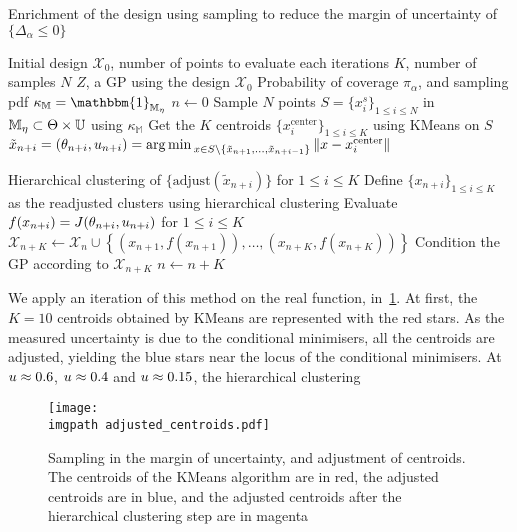 \documentclass[../../Main_ManuscritThese.tex]{subfiles}
\newcommand\imgpath{/home/victor/acadwriting/Manuscrit/Text/Chapter4/img/}
\begin{document}
\begin{algorithm}
  \caption{Enrichment of the design using sampling to reduce the margin of uncertainty of $\{\Delta_{\alpha}\leq 0\}$}
  \label{alg:sampling_enrichment_star}
\begin{algorithmic}
  \REQUIRE Initial design $\mathcal{X}_0$, 
  \REQUIRE number of points to evaluate each iterations $K$, number of samples $N$
  \REQUIRE $Z$, a GP using the design $\mathcal{X}_0$
  \REQUIRE Probability of coverage $\pi_{\alpha}$, and sampling pdf $\kappa_{\mathbb{M}} = \mathbbm{1}_{\mathbb{M}_{\eta}}$
\STATE $n \leftarrow 0$
\STATE Sample $N$ points $S = \{x^s_i\}_{1 \leq i \leq N}$ in $\mathbb{M}_{\eta}\subset \Theta \times \mathbb{U}$ using $\kappa_{\mathbb{M}}$
\STATE Get the $K$ centroids $\{x_i^{\mathrm{center}}\}_{1 \leq i \leq K}$ using KMeans on $S$
\STATE $\tilde{x}_{n+i}=(\theta_{n+i},u_{n+i})=\operatorname*{arg\,min \,}_{x \in S \setminus \{\tilde{x}_{n+1}, \dots, \tilde{x}_{n+i-1}\}} \|x - x_i^{\mathrm{center}} \|$
\ENDFOR

\STATE Hierarchical clustering of $\{\mathrm{adjust}(\tilde{x}_{n+i})\}$ for $1 \leq i \leq K$
\STATE Define $\{x_{n+i}\}_{1\leq i\leq K}$ as the readjusted clusters using hierarchical clustering
\STATE Evaluate $f(x_{n+i})=J(\theta_{n+i},u_{n+i})$ for $1\leq i \leq K$
\STATE $\mathcal{X}_{n+K} \leftarrow \mathcal{X}_n \cup \left\{\left(x_{n+1}, f(x_{n+1})\right),\dots,  \left(x_{n+K}, f(x_{n+K})\right)\right\}$
\STATE Condition the GP according to $\mathcal{X}_{n+K}$
\STATE $n \leftarrow n + K$
\ENDWHILE
\end{algorithmic}
\end{algorithm}

We apply an iteration of this method on the real function,
in~\cref{fig:adjusted_centroids}. At first, the $K=10$ centroids
obtained by KMeans are represented with the red stars. As the measured
uncertainty is due to the conditional minimisers, all the centroids
are adjusted, yielding the blue stars near the locus of the conditional minimisers. At
$u \approx \num{0.6}$, $u\approx\num{0.4}$ and $u\approx \num{0.15}$, the hierarchical clustering

\begin{figure}[ht]
  \centering
  \texttt{[image: \\imgpath adjusted\_centroids.pdf]}
  \caption[Full batch iteration with double
  adjustment]{\label{fig:adjusted_centroids} Sampling in the margin of
    uncertainty, and adjustment of centroids. The centroids of the
    KMeans algorithm are in red, the adjusted centroids are in blue,
    and the adjusted centroids after the hierarchical clustering step
    are in magenta}
\end{figure}
\end{document}
